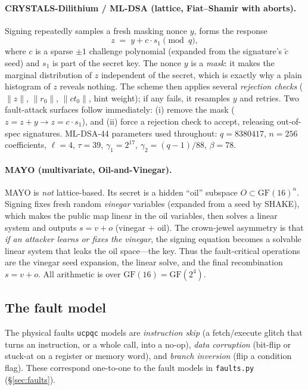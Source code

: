 \documentclass[11pt]{article}
\newcommand{\code}[1]{\texttt{#1}}
\newcommand{\ucpqc}{\code{ucpqc}}
\newcommand{\GF}[1]{\ensuremath{\mathrm{GF}(#1)}}
\begin{document}
\paragraph{CRYSTALS-Dilithium / ML-DSA (lattice, Fiat--Shamir with aborts).}
Signing repeatedly samples a fresh masking nonce $y$, forms the response
\[
  z \;=\; y + c\cdot s_1 \pmod{q},
\]
where $c$ is a sparse $\pm1$ challenge polynomial (expanded from the signature's
$\tilde c$ seed) and $s_1$ is part of the secret key. The nonce $y$ is a
\emph{mask}: it makes the marginal distribution of $z$ independent of the secret,
which is exactly why a plain histogram of $z$ reveals nothing. The scheme then
applies several \emph{rejection checks} ($\lVert z\rVert$, $\lVert r_0\rVert$,
$\lVert ct_0\rVert$, hint weight); if any fails, it resamples $y$ and retries. Two
fault-attack surfaces follow immediately: (i) remove the mask
($z=z+y \to z=c\cdot s_1$), and (ii) force a rejection check to accept, releasing
out-of-spec signatures. ML-DSA-44 parameters used throughout:
$q=8380417$, $n=256$ coefficients, $\ell=4$, $\tau=39$,
$\gamma_1=2^{17}$, $\gamma_2=(q-1)/88$, $\beta=78$.

\paragraph{MAYO (multivariate, Oil-and-Vinegar).}
MAYO is \emph{not} lattice-based. Its secret is a hidden ``oil'' subspace
$O\subset \GF{16}^n$. Signing fixes fresh random \emph{vinegar} variables (expanded
from a seed by SHAKE), which makes the public map linear in the oil variables, then
solves a linear system and outputs $s = v + o$ (vinegar $+$ oil). The crown-jewel
asymmetry is that \emph{if an attacker learns or fixes the vinegar}, the signing
equation becomes a solvable linear system that leaks the oil space---the key. Thus
the fault-critical operations are the vinegar seed expansion, the linear solve, and
the final recombination $s=v+o$. All arithmetic is over $\GF{16}=\GF{2^4}$.

\subsection{The fault model}
The physical faults \ucpqc{} models are \emph{instruction skip} (a fetch/execute
glitch that turns an instruction, or a whole call, into a no-op), \emph{data
corruption} (bit-flip or stuck-at on a register or memory word), and
\emph{branch inversion} (flip a condition flag). These correspond one-to-one to
the fault models in \code{faults.py} (\S\ref{sec:faults}).
\end{document}
